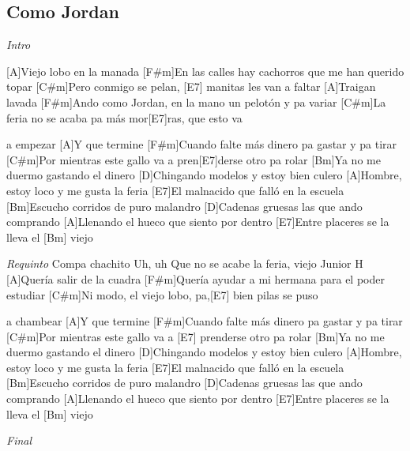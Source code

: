 \subsection{Como Jordan}

\noindent
\vspace{1cm}

\begin{guitar}
	\begin{multicols}{2}

		\textit{Intro}

		[A]Viejo lobo en la manada
		[F#m]En las calles hay cachorros que me han querido topar
		[C#m]Pero conmigo se pelan, [E7] manitas les van a faltar
		[A]Traigan lavada
		[F#m]Ando como Jordan, en la mano un pelotón y pa variar
		[C#m]La feria no se acaba pa más mor[E7]ras, que esto va \par a empezar
		[A]Y que termine
		[F#m]Cuando falte más dinero pa gastar y pa tirar
		[C#m]Por mientras este gallo va a pren[E7]derse otro pa rolar
		[Bm]Ya no me duermo gastando el dinero
		[D]Chingando modelos y estoy bien culero
		[A]Hombre, estoy loco y me gusta la feria
		[E7]El malnacido que falló en la escuela
		[Bm]Escucho corridos de puro malandro
		[D]Cadenas gruesas las que ando comprando
		[A]Llenando el hueco que siento por dentro
		[E7]Entre placeres se la lleva el [Bm] viejo

		\textit{Requinto}
		Compa chachito
		Uh, uh
		Que no se acabe la feria, viejo
		Junior H
		[A]Quería salir de la cuadra
		[F#m]Quería ayudar a mi hermana para el poder estudiar
		[C#m]Ni modo, el viejo lobo, pa,[E7] bien pilas se puso \par a chambear
		[A]Y que termine
		[F#m]Cuando falte más dinero pa gastar y pa tirar
		[C#m]Por mientras este gallo va a [E7] prenderse otro pa rolar
		[Bm]Ya no me duermo gastando el dinero
		[D]Chingando modelos y estoy bien culero
		[A]Hombre, estoy loco y me gusta la feria
		[E7]El malnacido que falló en la escuela
		[Bm]Escucho corridos de puro malandro
		[D]Cadenas gruesas las que ando comprando
		[A]Llenando el hueco que siento por dentro
		[E7]Entre placeres se la lleva el [Bm] viejo

		\textit{Final}

	\end{multicols}
\end{guitar}
